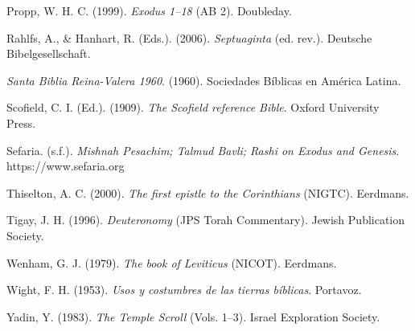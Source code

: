 \documentclass[11pt,letterpaper]{article}
\newcommand{\refapa}[1]{\par{\RaggedRight\hangindent=1.27cm\hangafter=1\noindent #1\par}\vspace{4pt}}
\begin{document}
\refapa{Propp, W. H. C. (1999). \emph{Exodus 1--18} (AB 2). Doubleday.}
\refapa{Rahlfs, A., \& Hanhart, R. (Eds.). (2006). \emph{Septuaginta} (ed. rev.). Deutsche Bibelgesellschaft.}
\refapa{\emph{Santa Biblia Reina-Valera 1960}. (1960). Sociedades Bíblicas en América Latina.}
\refapa{Scofield, C. I. (Ed.). (1909). \emph{The Scofield reference Bible}. Oxford University Press.}
\refapa{Sefaria. (s.f.). \emph{Mishnah Pesachim; Talmud Bavli; Rashi on Exodus and Genesis}. https://www.sefaria.org}
\refapa{Thiselton, A. C. (2000). \emph{The first epistle to the Corinthians} (NIGTC). Eerdmans.}
\refapa{Tigay, J. H. (1996). \emph{Deuteronomy} (JPS Torah Commentary). Jewish Publication Society.}
\refapa{Wenham, G. J. (1979). \emph{The book of Leviticus} (NICOT). Eerdmans.}
\refapa{Wight, F. H. (1953). \emph{Usos y costumbres de las tierras bíblicas}. Portavoz.}
\refapa{Yadin, Y. (1983). \emph{The Temple Scroll} (Vols. 1--3). Israel Exploration Society.}
\end{document}
